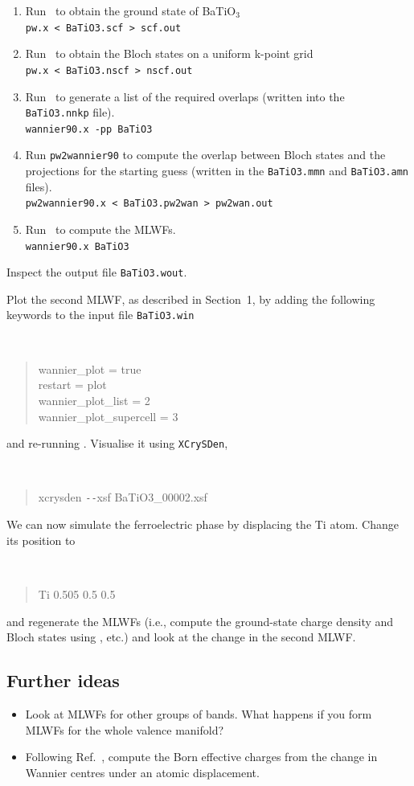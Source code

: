 \documentclass[a4paper,11pt,twoside]{article}
\begin{document}
\begin{enumerate}
\item Run \pwscf\ to obtain the ground state of BaTiO$_3$\\
{\tt pw.x < BaTiO3.scf > scf.out}

\item Run \pwscf\ to obtain the Bloch states on a uniform k-point grid\\
{\tt pw.x < BaTiO3.nscf > nscf.out}

\item Run \wannier\ to generate a list of the required overlaps (written
  into the {\tt BaTiO3.nnkp} file).\\ 
{\tt wannier90.x -pp BaTiO3}

\item Run {\tt pw2wannier90} to compute the overlap between Bloch
  states and the projections for the starting guess (written in the
  {\tt BaTiO3.mmn} and {\tt BaTiO3.amn} files).\\  
{\tt pw2wannier90.x < BaTiO3.pw2wan > pw2wan.out}

\item Run \wannier\ to compute the MLWFs.\\
{\tt wannier90.x BaTiO3}
\end{enumerate}

Inspect the output file {\tt BaTiO3.wout}. 

Plot the second MLWF, as described in Section~1, by adding the
following keywords to the input file {\tt BaTiO3.win}
{\tt
\begin{quote}
wannier\_plot = true\\
restart = plot\\
wannier\_plot\_list = 2\\
wannier\_plot\_supercell = 3
\end{quote} }
and re-running \wannier. Visualise it using {\tt XCrySDen},
{\tt
\begin{quote}
xcrysden \texttt{-{}-}xsf BaTiO3\_00002.xsf
\end{quote} }

We can now simulate the ferroelectric phase by displacing the Ti
  atom. Change its position to 
{\tt
\begin{quote}
Ti 0.505 0.5 0.5
\end{quote}
}
and regenerate the MLWFs (i.e., compute the ground-state charge
density and Bloch states using \pwscf, etc.) and look at the change in
the second MLWF.

\subsection*{Further ideas}
\begin{itemize}
\item Look at MLWFs for other groups of bands. What happens if you form
  MLWFs for the whole valence manifold?

\item Following Ref.~\cite{marzari-arxiv98}, compute the Born effective charges from the
  change in Wannier centres under an atomic displacement. 
\end{itemize}
\end{document}

